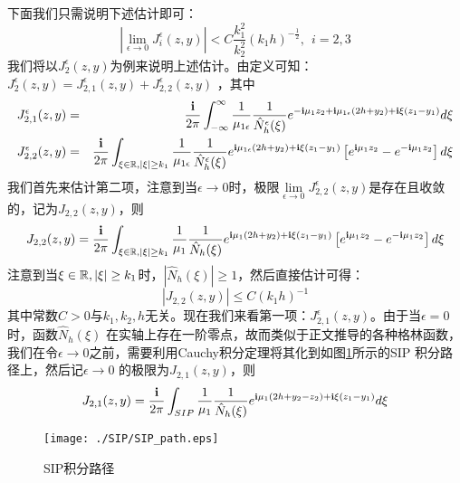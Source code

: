 下面我们只需说明下述估计即可：
\begin{equation}
 \left|\lim\limits_{\epsilon\rightarrow0}J^{\epsilon}_i(z,y)\right|<C\frac{k_1^2}{k_2^2}(k_1h)^{-\frac{1}{2}},\ \ i=2,3
\end{equation}
我们将以$J^{\epsilon}_2(z,y)$为例来说明上述估计。由定义可知：$J^{\epsilon}_2(z,y)=J^{\epsilon}_{2,1}(z,y)+J^{\epsilon}_{2,2}(z,y)$ ，其中
\begin{eqnarray*}
    J^{\epsilon}_{2,1}(z,y)&=&\frac{\mathbf{i}}{2\pi}\int_{-\infty}^{\infty}
        \frac{1}{\mu_{1\epsilon}}\frac{1}{\hat N_h^{\epsilon}(\xi)}e^{-\mathbf{i} \mu_1 z_2+\mathbf{i}\mu_{1\epsilon}(2h+y_2)+\mathbf{i}\xi(z_1-y_1)}d\xi\\
    J^{\epsilon}_{2,2}(z,y)&=&\frac{\mathbf{i}}{2\pi}\int_{\xi\in\mathbb{R},|\xi|\geq k_1}
   \frac{1}{\mu_{1\epsilon}}\frac{1}{\hat N_h^{\epsilon}(\xi)}e^{\mathbf{i}\mu_{1\epsilon}(2h+y_2)+\mathbf{i}\xi(z_1-y_1)}
   \left[e^{\mathbf{i}\mu_1 z_2}-e^{-\mathbf{i}\mu_1 z_2}\right]d\xi
\end{eqnarray*}
我们首先来估计第二项，注意到当$\epsilon\rightarrow0$时，极限$\lim\limits_{\epsilon\rightarrow0}J^{\epsilon}_{2,2}(z,y)$是存在且收敛的，记为$J_{2,2}(z,y)$，则
\begin{equation}
  J_{2,2}(z,y)=\frac{\mathbf{i}}{2\pi}\int_{\xi\in\mathbb{R},|\xi|\geq k_1}
   \frac{1}{\mu_1}\frac{1}{\hat N_h(\xi)}e^{\mathbf{i}\mu_1(2h+y_2)+\mathbf{i}\xi(z_1-y_1)}
   \left[e^{\mathbf{i}\mu_1 z_2}-e^{-\mathbf{i}\mu_1 z_2}\right]d\xi
\end{equation}
注意到当$\xi\in\mathbb{R},|\xi|\geq k_1$时，$|\hat N_h(\xi)|\geq 1$，然后直接估计可得：
\begin{equation}
  | J_{2,2}(z,y)|\leq C(k_1h)^{-1}
\end{equation}
其中常数$C>0$与$k_1,k_2,h$无关。现在我们来看第一项：$J^{\epsilon}_{2,1}(z,y)$。由于当$\epsilon=0$时，函数$\hat N_h(\xi)$ 在实轴上存在一阶零点，故而类似于正文推导的各种格林函数，我们在令$\epsilon\rightarrow0$之前，需要利用Cauchy积分定理将其化到如图\ref{SIP_path4}所示的SIP 积分路径上，然后记$\epsilon\rightarrow0$ 的极限为$J_{2,1}(z,y)$，则
\begin{equation}
  J_{2,1}(z,y)=\frac{\mathbf{i}}{2\pi}\int_{SIP}
        \frac{1}{\mu_1}\frac{1}{\hat N_h(\xi)}e^{\mathbf{i}\mu_1(2h+y_2-z_2)+\mathbf{i}\xi(z_1-y_1)}d\xi
\end{equation}
\begin{figure}
  \centering
  \texttt{[image: ./SIP/SIP\_path.eps]}
  \caption{SIP积分路径}\label{SIP_path4}
\end{figure}

